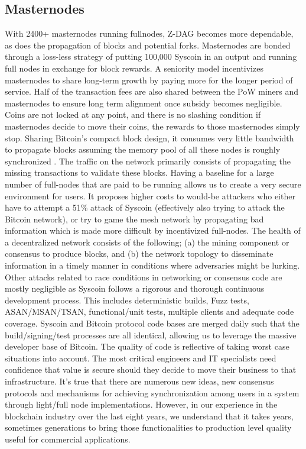 \documentclass[peerreview]{ieeesyscoin}
\begin{document}
\subsection{Masternodes}

With 2400+ masternodes running fullnodes, Z-DAG becomes more dependable, as does the propagation of blocks and potential forks. Masternodes are bonded through a loss-less strategy of putting 100,000 Syscoin in an output and running full nodes in exchange for block rewards. A seniority model incentivizes masternodes to share long-term growth by paying more for the longer period of service. Half of the transaction fees are also shared between the PoW miners and masternodes to ensure long term alignment once subsidy becomes negligible. Coins are not locked at any point, and there is no slashing condition if masternodes decide to move their coins, the rewards to those masternodes simply stop. Sharing Bitcoin’s compact block design, it consumes very little bandwidth to propagate blocks assuming the memory pool of all these nodes is roughly synchronized \cite{BitCore}. The traffic on the network primarily consists of propagating the missing transactions to validate these blocks. Having a baseline for a large number of full-nodes that are paid to be running allows us to create a very secure environment for users. It proposes higher costs to would-be attackers who either have to attempt a 51\% attack of Syscoin (effectively also trying to attack the Bitcoin network), or try to game the mesh network by propagating bad information which is made more difficult by incentivized full-nodes. The health of a decentralized network consists of the following; (a) the mining component or consensus to produce blocks, and (b) the network topology to disseminate information in a timely manner in conditions where adversaries might be lurking. Other attacks related to race conditions in networking or consensus code are mostly negligible as Syscoin follows a rigorous and thorough continuous development process. This includes deterministic builds, Fuzz tests, ASAN/MSAN/TSAN, functional/unit tests, multiple clients and adequate code coverage. Syscoin and Bitcoin protocol code bases are merged daily such that the build/signing/test processes are all identical, allowing us to leverage the massive developer base of Bitcoin. The quality of code is reflective of taking worst case situations into account. The most critical engineers and IT specialists need confidence that value is secure should they decide to move their business to that infrastructure. It’s true that there are numerous new ideas, new consensus protocols and mechanisms for achieving synchronization among users in a system through light/full node implementations. However, in our experience in the blockchain industry over the last eight years, we understand that it takes years, sometimes generations to bring those functionalities to production level quality useful for commercial applications. 
\end{document}
